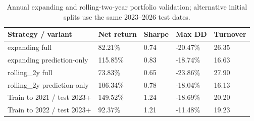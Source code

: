 \begin{table}[htbp]
\caption{Annual expanding and rolling-two-year portfolio validation; alternative initial splits use the same 2023--2026 test dates.}
\label{tab:walk-forward}
\begin{tabular}{lllll}
\toprule
Strategy / variant & Net return & Sharpe & Max DD & Turnover \\
\midrule
expanding full & 82.21\% & 0.74 & -20.47\% & 26.35 \\
expanding prediction-only & 115.85\% & 0.83 & -18.74\% & 16.63 \\
rolling\_2y full & 73.83\% & 0.65 & -23.86\% & 27.90 \\
rolling\_2y prediction-only & 106.34\% & 0.78 & -18.04\% & 16.13 \\
Train to 2021 / test 2023+ & 149.52\% & 1.24 & -18.69\% & 20.20 \\
Train to 2022 / test 2023+ & 92.37\% & 1.21 & -11.48\% & 19.23 \\
\bottomrule
\end{tabular}
\end{table}
